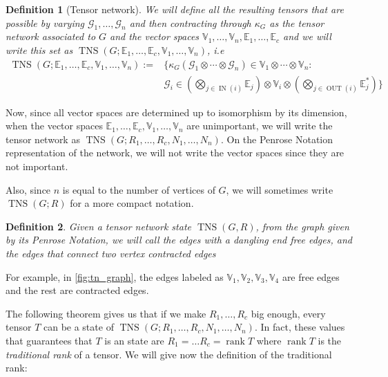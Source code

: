 \documentclass[11pt,a4paper,openright,oneside]{book}
\numberwithin{equation}{section}
\newtheorem{defn0}{Definition}[chapter]
\newenvironment{definition}{ \begin{defn0}}{\end{defn0}}
\newcommand{\figref}[1]{\cref{#1}}
\DeclareMathOperator{\rank}{rank}
\DeclareMathOperator{\IN}{IN}
\DeclareMathOperator{\OUT}{OUT}
\DeclareMathOperator{\TNS}{TNS}
\begin{document}
\begin{definition}[Tensor network]
    We will define all the resulting tensors that are possible by varying $\mathcal{G}_1, \dots, \mathcal{G}_n$ and then contracting through $\kappa_G$ as the tensor network
associated to $G$ and the vector spaces $\mathbb{V}_1, \dots, \mathbb{V}_n, \mathbb{E}_1, \dots, \mathbb{E}_c$ and we will write this set
as $\TNS(G; \mathbb{E}_1, \dots, \mathbb{E}_c, \mathbb{V}_1, \dots, \mathbb{V}_n)$, i.e
$$
\begin{align}
    \TNS(G; \mathbb{E}_1, \dots, \mathbb{E}_c, \mathbb{V}_1, \dots, \mathbb{V}_n) := & \Bigg\{ \kappa_G(\mathcal{G}_1 \otimes \cdots \otimes \mathcal{G}_n) \in \mathbb{V}_1 \otimes \cdots \otimes \mathbb{V}_n : \\
                                                                                     & \mathcal{G}_i \in \left( \bigotimes\nolimits_{j \in \IN (i)} \mathbb{E}_j \right) \otimes \mathbb{V}_i \otimes 
\left( \bigotimes\nolimits_{j \in \OUT (i)} \mathbb{E}_j^*  \right) \Bigg\}
\end{align}
$$
\end{definition}
Now, since all vector spaces are determined up to isomorphism by its dimension, when the vector spaces $\mathbb{E}_1, \dots, \mathbb{E}_c, \mathbb{V}_1, \dots, \mathbb{V}_n$ are unimportant,
we will write the tensor network as $\TNS(G; R_1, \dots, R_c, N_1, \dots, N_n)$. On the Penrose
Notation representation of the network, we will not write the vector spaces since they are
not important.

Also, since $n$ is equal to the number of vertices of $G$, we will sometimes write $\TNS(G; R)$ for a more compact notation.

\begin{definition}
    Given a tensor network state $\TNS(G, R)$, from the graph given by its Penrose Notation,
    we will call the edges with a dangling end \textit{free edges}, and the edges that connect two vertex \textit{contracted edges}
\end{definition}
For example, in \figref{fig:tn_graph}, the edges labeled as $\mathbb{V}_1, \mathbb{V}_2, \mathbb{V}_3, \mathbb{V}_4$ are 
free edges and the rest are contracted edges.

The following theorem gives us that if we make $R_1, \dots, R_c$ big enough, every tensor $T$ can be a state of $\TNS(G; R_1, \dots, R_c, N_1, \dots, N_n)$.
In fact, these values that guarantees that $T$ is an state are $R_1 = \dots R_c = \rank T$ where $\rank T$ is the \textit{traditional rank}
of a tensor. We will give now the definition of the traditional rank:
\end{document}
